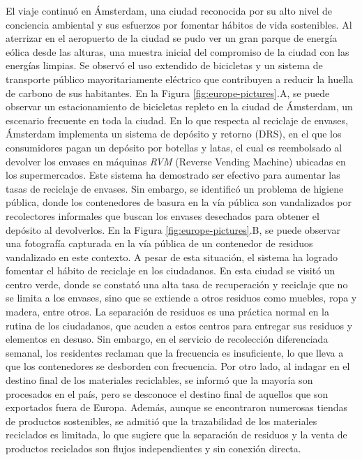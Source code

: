 El viaje continuó en Ámsterdam, una ciudad reconocida por su alto nivel de conciencia ambiental y sus esfuerzos por fomentar hábitos de vida sostenibles. Al aterrizar en el aeropuerto de la ciudad se pudo ver un gran parque de energía eólica desde las alturas, una muestra inicial del compromiso de la ciudad con las energías limpias. Se observó el uso extendido de bicicletas y un sistema de transporte público mayoritariamente eléctrico que contribuyen a reducir la huella de carbono de sus habitantes. En la Figura \ref{fig:europe-pictures}.A, se puede observar un estacionamiento de bicicletas repleto en la ciudad de Ámsterdam, un escenario frecuente en toda la ciudad. En lo que respecta al reciclaje de envases, Ámsterdam implementa un sistema de depósito y retorno (DRS), en el que los consumidores pagan un depósito por botellas y latas, el cual es reembolsado al devolver los envases en máquinas \textit{RVM} (Reverse Vending Machine) ubicadas en los supermercados. Este sistema ha demostrado ser efectivo para aumentar las tasas de reciclaje de envases. Sin embargo, se identificó un problema de higiene pública, donde los contenedores de basura en la vía pública son vandalizados por recolectores informales que buscan los envases desechados para obtener el depósito al devolverlos. En la Figura \ref{fig:europe-pictures}.B, se puede observar una fotografía capturada en la vía pública de un contenedor de residuos vandalizado en este contexto. A pesar de esta situación, el sistema ha logrado fomentar el hábito de reciclaje en los ciudadanos. En esta ciudad se visitó un centro verde, donde se constató una alta tasa de recuperación y reciclaje que no se limita a los envases, sino que se extiende a otros residuos como muebles, ropa y madera, entre otros. La separación de residuos es una práctica normal en la rutina de los ciudadanos, que acuden a estos centros para entregar sus residuos y elementos en desuso. Sin embargo, en el servicio de recolección diferenciada semanal, los residentes reclaman que la frecuencia es insuficiente, lo que lleva a que los contenedores se desborden con frecuencia. Por otro lado, al indagar en el destino final de los materiales reciclables, se informó que la mayoría son procesados en el país, pero se desconoce el destino final de aquellos que son exportados fuera de Europa. Además, aunque se encontraron numerosas tiendas de productos sostenibles, se admitió que la trazabilidad de los materiales reciclados es limitada, lo que sugiere que la separación de residuos y la venta de productos reciclados son flujos independientes y sin conexión directa.

